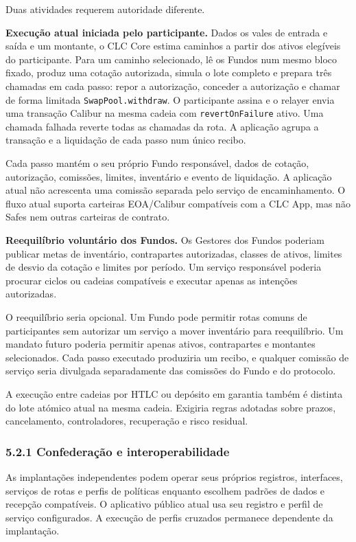 \documentclass[11pt]{article}
\begin{document}
Duas atividades requerem autoridade diferente.

\textbf{Execução atual iniciada pelo participante.} Dados os vales de entrada e saída e um montante, o CLC Core estima caminhos a partir dos ativos elegíveis do participante. Para um caminho selecionado, lê os Fundos num mesmo bloco fixado, produz uma cotação autorizada, simula o lote completo e prepara três chamadas em cada passo: repor a autorização, conceder a autorização e chamar de forma limitada \texttt{SwapPool.withdraw}. O participante assina e o relayer envia uma transação Calibur na mesma cadeia com \texttt{revertOnFailure} ativo. Uma chamada falhada reverte todas as chamadas da rota. A aplicação agrupa a transação e a liquidação de cada passo num único recibo.

Cada passo mantém o seu próprio Fundo responsável, dados de cotação, autorização, comissões, limites, inventário e evento de liquidação. A aplicação atual não acrescenta uma comissão separada pelo serviço de encaminhamento. O fluxo atual suporta carteiras EOA/Calibur compatíveis com a CLC App, mas não Safes nem outras carteiras de contrato.

\textbf{Reequilíbrio voluntário dos Fundos.} Os Gestores dos Fundos poderiam publicar metas de inventário, contrapartes autorizadas, classes de ativos, limites de desvio da cotação e limites por período. Um serviço responsável poderia procurar ciclos ou cadeias compatíveis e executar apenas as intenções autorizadas.

O reequilíbrio seria opcional. Um Fundo pode permitir rotas comuns de participantes sem autorizar um serviço a mover inventário para reequilíbrio. Um mandato futuro poderia permitir apenas ativos, contrapartes e montantes selecionados. Cada passo executado produziria um recibo, e qualquer comissão de serviço seria divulgada separadamente das comissões do Fundo e do protocolo.

A execução entre cadeias por HTLC ou depósito em garantia também é distinta do lote atómico atual na mesma cadeia. Exigiria regras adotadas sobre prazos, cancelamento, controladores, recuperação e risco residual.

\subsubsection*{5.2.1 Confederação e interoperabilidade}

As implantações independentes podem operar seus próprios registros, interfaces, serviços de rotas e perfis de políticas enquanto escolhem padrões de dados e recepção compatíveis. O aplicativo público atual usa seu registro e perfil de serviço configurados. A execução de perfis cruzados permanece dependente da implantação.
\end{document}
